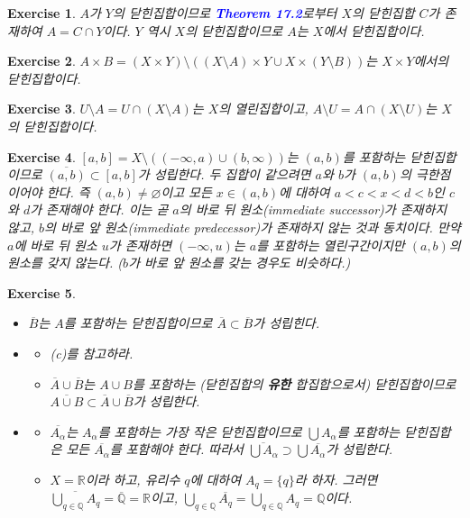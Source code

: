 \documentclass{article}
\newtheorem{exercise}{Exercise}[section]
\newcommand{\Q}{\mathbb{Q}}
\newcommand{\R}{\mathbb{R}}
\begin{document}
\begin{exercise}
    $A$가 $Y$의 닫힌집합이므로 \textcolor{blue}{\textbf{Theorem 17.2}}로부터 $X$의 닫힌집합 $C$가 존재하여 $A=C\cap Y$이다. $Y$ 역시 $X$의 닫힌집합이므로 $A$는 $X$에서 닫힌집합이다.
\end{exercise}

\begin{exercise}
    $A\times B=(X\times Y)\setminus((X\setminus A)\times Y\cup X\times(Y\setminus B))$는 $X\times Y$에서의 닫힌집합이다.
\end{exercise}

\begin{exercise}
    $U\setminus A=U\cap(X\setminus A)$는 $X$의 열린집합이고, $A\setminus U=A\cap (X\setminus U)$는 $X$의 닫힌집합이다.
\end{exercise}

\begin{exercise}
    $[a,b]=X\setminus((-\infty,a)\cup(b,\infty))$는 $(a,b)$를 포함하는 닫힌집합이므로 $\overline{(a,b)}\subset[a,b]$가 성립한다. 두 집합이 같으려면 $a$와 $b$가 $(a,b)$의 극한점이어야 한다. 즉 $(a,b)\ne\varnothing$이고 모든 $x\in(a,b)$에 대하여 $a<c<x<d<b$인 $c$와 $d$가 존재해야 한다. 이는 곧 $a$의 바로 뒤 원소(immediate successor)가 존재하지 않고, $b$의 바로 앞 원소(immediate predecessor)가 존재하지 않는 것과 동치이다. 만약 $a$에 바로 뒤 원소 $u$가 존재하면 $(-\infty,u)$는 $a$를 포함하는 열린구간이지만 $(a,b)$의 원소를 갖지 않는다. ($b$가 바로 앞 원소를 갖는 경우도 비슷하다.)
\end{exercise}

\begin{exercise}
	\label{exc:17.6}
    \phantom{}
    \begin{itemize}
        \item[(a)] $\overline{B}$는 $A$를 포함하는 닫힌집합이므로 $\overline{A}\subset\overline{B}$가 성립힌다.
        \item[(b)] \begin{itemize}
            \item[($\supset$)] (c)를 참고하라.
            \item[($\subset$)] $\overline{A}\cup\overline{B}$는 $A\cup B$를 포함하는 (닫힌집합의 \textbf{유한} 합집합으로서) 닫힌집합이므로 $\overline{A\cup B}\subset\overline{A}\cup\overline{B}$가 성립한다.
        \end{itemize}
        \item[(c)] \begin{itemize}
            \item[($\supset$)] $\overline{A_\alpha}$는 $A_\alpha$를 포함하는 가장 작은 닫힌집합이므로 $\bigcup A_\alpha$를 포함하는 닫힌집합은 모든 $\overline{A_\alpha}$를 포함해야 한다. 따라서 $\overline{\bigcup A_\alpha}\supset\bigcup\overline{A_\alpha}$가 성립한다.
            \item[($\not\subset$)] $X=\R$이라 하고, 유리수 $q$에 대하여 $A_q=\{q\}$라 하자. 그러면 $\overline{\bigcup_{q\in\Q}A_q}=\overline{\Q}=\R$이고, $\bigcup_{q\in\Q}\overline{A_q}=\bigcup_{q\in\Q}A_q=\Q$이다.
        \end{itemize}
    \end{itemize}
\end{exercise}
\end{document}
